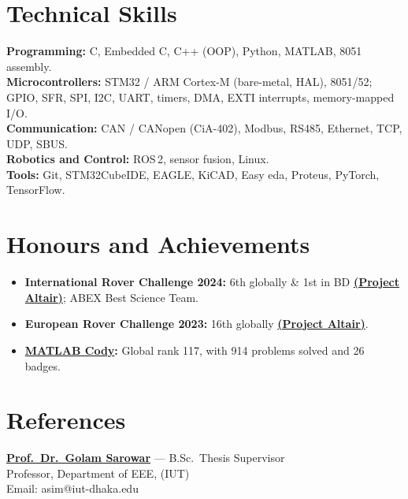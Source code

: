 \documentclass[10pt]{article}
\newcommand{\me}{\textbf{M.\ Islam}}
\begin{document}

\vspace{-3pt}
\section*{Technical Skills}
\vspace{-3pt}
\textbf{Programming:} C, Embedded C, C++ (OOP), Python, MATLAB, 8051 assembly. \\
\textbf{Microcontrollers:} STM32 / ARM Cortex-M (bare-metal, HAL), 8051/52; GPIO, SFR, SPI, I2C,
UART, timers, DMA, EXTI interrupts, memory-mapped I/O. \\
\textbf{Communication:} CAN / CANopen (CiA-402), Modbus, RS485, Ethernet, TCP, UDP, SBUS. \\
\textbf{Robotics and Control:} ROS\,2, sensor fusion, Linux. \\
\textbf{Tools:} Git, STM32CubeIDE, EAGLE, KiCAD, Easy eda, Proteus, PyTorch, TensorFlow.

\section*{Honours and Achievements}
\begin{itemize}
    \item \textbf{International Rover Challenge 2024:} 6th globally \& 1st in BD \textbf{\href{https://www.youtube.com/@projectAltair}{(Project Altair)}};
    ABEX Best Science Team.
    \item \textbf{European Rover Challenge 2023:} 16th globally \textbf{\href{https://www.youtube.com/@projectAltair}{(Project Altair)}}.
    \item \textbf{\href{https://www.mathworks.com/matlabcentral/profile/authors/25804044}{MATLAB
    Cody}:} Global rank 117, with 914 problems solved and 26 badges.
\end{itemize}

\section*{References}
\textbf{\href{https://scholar.google.com/citations?hl=en\&user=3waAWaYAAAAJ\&view_op=list_works\&sortby=pubdate}{Prof.\ Dr.\ Golam Sarowar}} --- B.Sc.\ Thesis Supervisor \\
Professor, Department of EEE, (IUT) \\
Email: asim@iut-dhaka.edu
\end{document}

